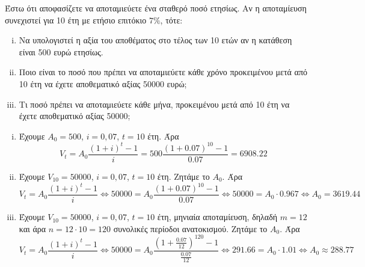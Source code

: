 \begin{example}
Έστω ότι αποφασίζετε να αποταμιεύετε ένα σταθερό ποσό ετησίως. Αν η αποταμίευση 
συνεχιστεί για 10 έτη με ετήσιο επιτόκιο $ 7\% $, τότε:
\begin{enumerate}[i)]
  \item Να υπολογιστεί η αξία του αποθέματος στο τέλος των 10 ετών αν η κατάθεση είναι 
    500 ευρώ ετησίως.
  \item Ποιο είναι το ποσό που πρέπει να αποταμιεύετε κάθε χρόνο προκειμένου μετά από 
    10 έτη να έχετε αποθεματικό αξίας 50000 ευρώ; 
  \item Τι ποσό πρέπει να αποταμιεύετε κάθε μήνα, προκειμένου μετά από 10 έτη να έχετε
    αποθεματικό αξίας 50000; 
\end{enumerate}
\begin{solution}
\item {}
  \begin{enumerate}[i)]
    \item Έχουμε $ A_{0} = 500 $, $ i=0,07 $, $ t=10 $ έτη. Άρα
      \[
        V_{t} = A_{0} \frac{(1+i)^{t}-1}{i} = 500 \frac{(1+0.07)^{10}-1}{0.07} = 
        6908.22
      \] 
    \item Έχουμε $ V_{10} = 50000 $, $ i=0,07 $, $ t=10 $ έτη. Ζητάμε το $ A_{0} $. Άρα
      \[
        V_{t} = A_{0} \frac{(1+i)^{t}-1}{i} \Leftrightarrow 50000 = A_{0}
        \frac{(1+0.07)^{10}-1}{0.07} \Leftrightarrow 50000 = A_{0} \cdot 0.967 
        \Leftrightarrow A_{0} = 3619.44
      \] 
    \item Έχουμε $ V_{10} = 50000 $, $ i=0,07 $, $ t=10 $ έτη, μηνιαία αποταμίευση,
      δηλαδή $ m=12 $ και άρα $n = 12\cdot 10 = 120$ συνολικές περίοδοι ανατοκισμού. 
      Ζητάμε το $ A_{0} $. Άρα
      \[
        V_{t} = A_{0} \frac{(1+i)^{t}-1}{i} \Leftrightarrow 50000 = A_{0}
        \frac{(1+ \frac{0.07}{12})^{120}-1}{\frac{0.07}{12}} \Leftrightarrow 291.66 =
        A_{0} \cdot 1.01 \Leftrightarrow A_{0} \approx 288.77
       \] 
  \end{enumerate}
\end{solution}
\end{example}


